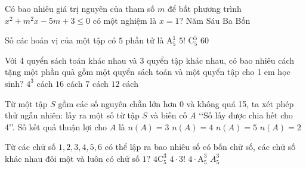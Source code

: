 \begin{ex}%
	Có bao nhiêu giá trị nguyên của tham số $m$ để bất phương trình $x^2+m^2 x-5 m+3 \leqslant 0$ có một nghiệm là $x=1$? \choice
	{Năm}
	{Sáu}
	{Ba}
	{\True Bốn}
\end{ex}
\begin{ex}%
	Số các hoán vị của một tập có $5$ phần tử là \choice
	{$\mathrm A_5^1$}
	{\True $5!$}
	{$\mathrm C_5^5$}
	{$60$}
\end{ex}
\begin{ex}%
	Với 4 quyển sách toán khác nhau và 3 quyển tập khác nhau, có bao nhiêu cách tặng một phần quà gồm một quyển sách toán và một quyển tập cho 1 em học sinh? \choice
	{$4^3$ cách}
	{$16$ cách}
	{$7$ cách}
	{\True $12$ cách}
\end{ex}
\begin{ex}%
	Từ một tập $S$ gồm các số nguyên chẵn lớn hơn 0 và không quá 15, ta xét phép thử ngẫu nhiên: lấy ra một số từ tập $S$ và biến cố $A$ \lq\lq Số lấy được chia hết cho 4\rq\rq. Số kết quả thuận lợi cho $A$ là \choice
	{\True $n(A)=3$}
	{$n(A)=4$}
	{$n(A)=5$}
	{$n(A)=2$}
\end{ex}
\begin{ex}%
	Từ các chữ số $1,2,3,4,5,6$ có thể lập ra bao nhiêu số có bốn chữ số, các chữ số khác nhau đôi một và luôn có chữ số $1$? \choice
	{$4 \mathrm C_5^3$}
	{$4 \cdot 3 !$}
	{\True $4 \cdot \mathrm A_5^3$}
	{$A_5^3$}
\end{ex}
